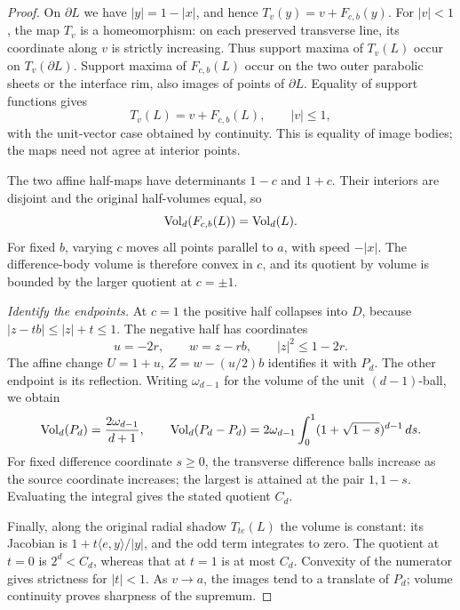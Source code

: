 \begin{proof}
On $\partial L$ we have $|y|=1-|x|$, and hence
$T_v(y)=v+F_{c,b}(y)$. For $|v|<1$, the map $T_v$ is a homeomorphism:
on each preserved transverse line, its coordinate along $v$ is strictly
increasing. Thus support maxima of $T_v(L)$ occur on $T_v(\partial L)$.
Support maxima of $F_{c,b}(L)$ occur on the two outer parabolic sheets
or the interface rim, also images of points of $\partial L$.
Equality of support functions gives
\[
 T_v(L)=v+F_{c,b}(L),\qquad |v|\leq1,
\]
with the unit-vector case obtained by continuity. This is equality of
image bodies; the maps need not agree at interior points.

The two affine half-maps have determinants $1-c$ and $1+c$.
Their interiors are disjoint and the original half-volumes equal, so
\[
 \operatorname{Vol}_d(F_{c,b}(L))=\operatorname{Vol}_d(L).
\]
For fixed $b$, varying $c$ moves all points parallel to $a$, with speed
$-|x|$. The difference-body volume is therefore convex in $c$, and its
quotient by volume is bounded by the larger quotient at $c=\pm1$.

\emph{Identify the endpoints.}
At $c=1$ the positive half collapses into $D$, because
$|z-tb|\leq|z|+t\leq1$. The negative half has coordinates
\[
 u=-2r,\qquad w=z-rb,\qquad |z|^2\leq1-2r.
\]
The affine change $U=1+u$, $Z=w-(u/2)b$ identifies it with $P_d$.
The other endpoint is its reflection. Writing $\omega_{d-1}$ for the
volume of the unit $(d-1)$-ball, we obtain
\[
 \operatorname{Vol}_d(P_d)=\frac{2\omega_{d-1}}{d+1},\qquad
 \operatorname{Vol}_d(P_d-P_d)=2\omega_{d-1}
   \int_0^1(1+\sqrt{1-s})^{d-1}\,ds.
\]
For fixed difference coordinate $s\geq0$, the transverse difference
balls increase as the source coordinate increases; the largest is
attained at the pair $1,1-s$. Evaluating the integral gives the stated
quotient $C_d$.

Finally, along the original radial shadow $T_{te}(L)$ the volume is
constant: its Jacobian is $1+t\langle e,y\rangle/|y|$, and the odd term
integrates to zero. The quotient at $t=0$ is $2^d<C_d$, whereas that at
$t=1$ is at most $C_d$. Convexity of the numerator gives strictness for
$|t|<1$. As $v\to a$, the images tend to a translate of $P_d$; volume
continuity proves sharpness of the supremum.
\end{proof}

